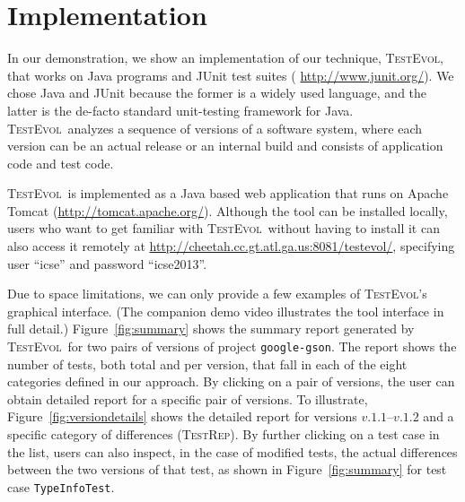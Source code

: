\documentclass[conference]{IEEEtran}
\newcommand{\lang}[1]{\texttt{\small #1}}
\newcommand{\subject}[1]{\texttt{\small #1}}
\newcommand{\catrep}{\textsc{TestRep}}
\newcommand{\tool}{\textsc{TestEvol}\xspace}
\begin{document}


\section{Implementation}
\label{sec:implementation}


In our demonstration, we show an implementation of our technique,
\tool, that works on Java programs and JUnit test suites ({\small
  \url{http://www.junit.org/}}). We chose Java and JUnit because the
former is a widely used language, and the latter is the de-facto
standard unit-testing framework for Java.  \tool\ analyzes a sequence
of versions of a software system, where each version can be an actual
release or an internal build and consists of application code and test
code.

\tool\ is implemented as a Java based web application that runs on
Apache Tomcat ({\small \url{http://tomcat.apache.org/}}). Although the
tool can be installed locally, users who want to get familiar with
\tool\ without having to install it can also access it remotely at
{\small \url{http://cheetah.cc.gt.atl.ga.us:8081/testevol/}},
specifying user ``icse'' and password ``icse2013''.

Due to space limitations, we can only provide a few examples of
\tool's graphical interface. (The companion demo video illustrates the
tool interface in full detail.) Figure~\ref{fig:summary} shows the
summary report generated by \tool\ for two pairs of versions of
project \subject{google-gson}. The report shows the number of tests,
both total and per version, that fall in each of the eight categories
defined in our approach.  By clicking on a pair of versions, the user
can obtain detailed report for a specific pair of versions. To
illustrate, Figure~\ref{fig:versiondetails} shows the detailed report
for versions $v.1.1$--$v.1.2$ and a specific category of differences
(\catrep). By further clicking on a test case in the list, users can
also inspect, in the case of modified tests, the actual differences
between the two versions of that test, as shown in
Figure~\ref{fig:summary} for test case \subject{TypeInfoTest}.
\end{document}
